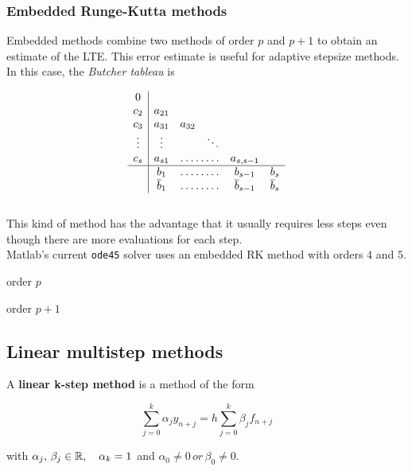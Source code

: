 \subsubsection{Embedded Runge-Kutta methods}

Embedded methods combine two methods of order $p$ and $p+1$ to obtain an estimate of the LTE. This error estimate is useful for adaptive stepsize methods. \\

In this case, the \textit{Butcher tableau} is

$$\begin{array}{c|c c c c c}
     0                                                                   \\
     c_2    & a_{21}                                                     \\
     c_3    & a_{31}            & a_{32}                                 \\
     \vdots & \vdots            &                  & \ddots              \\
     c_s    & a_{s1}            & \hdotsfor{2}               & a_{s,s-1} \\
     \hline
            & b_1               & \hdotsfor{2}               & b_{s-1}   & b_s  \\
            & \overline{b}_1    & \hdotsfor{2}               & \overline{b}_{s-1}  &\overline{b}_s
\end{array}$$\-\\
This kind of method has the advantage that it usually requires less steps even though there are more evaluations for each step.\\

Matlab's current \texttt{ode45} solver uses an embedded RK method with orders $4$ and $5$.

\vspace{-3.5cm}\hspace{11.2cm}order $p$

\vspace{+0.05cm}\hspace{11.2cm}order $p+1$

\newpage
\subsection{Linear multistep methods}

\begin{definition}
  A \textbf{linear k-step method} is a method of the form
  
  \[
    \sum_{j=0}^k\alpha_jy_{n+j} = h\sum_{j=0}^k\beta_jf_{n+j}
  \]
  
  with $\alpha_j,\,\beta_j\in\mathbb{R}, \quad \alpha_k = 1$ and $\alpha_0 \not=0 \, or \, \beta_0\not= 0$. \\
\end{definition}

